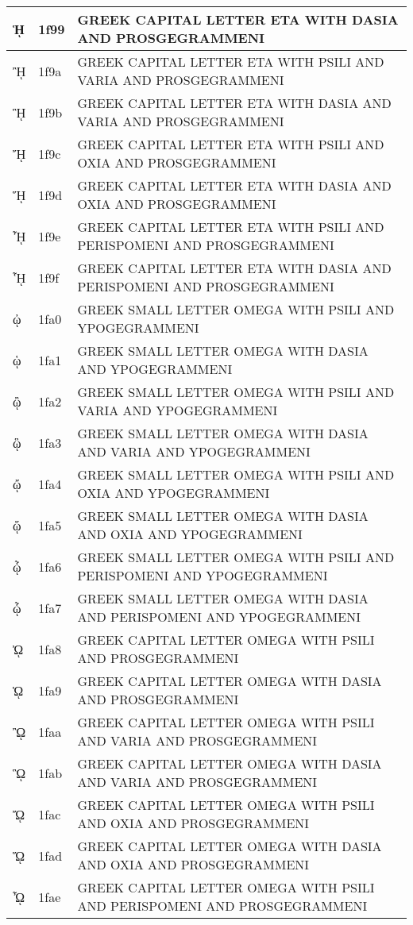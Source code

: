\documentclass[12pt,letterpaper,openany]{book}
\begin{document}
\begin{center}
\begin{supertabular}{|m{0.25in}|m{0.5in}|m{4in}|}
ᾙ & 1f99 & GREEK CAPITAL LETTER ETA WITH DASIA AND PROSGEGRAMMENI\\\hline
ᾚ & 1f9a & GREEK CAPITAL LETTER ETA WITH PSILI AND VARIA AND PROSGEGRAMMENI\\\hline
ᾛ & 1f9b & GREEK CAPITAL LETTER ETA WITH DASIA AND VARIA AND PROSGEGRAMMENI\\\hline
ᾜ & 1f9c & GREEK CAPITAL LETTER ETA WITH PSILI AND OXIA AND PROSGEGRAMMENI\\\hline
ᾝ & 1f9d & GREEK CAPITAL LETTER ETA WITH DASIA AND OXIA AND PROSGEGRAMMENI\\\hline
ᾞ & 1f9e & GREEK CAPITAL LETTER ETA WITH PSILI AND PERISPOMENI AND PROSGEGRAMMENI\\\hline
ᾟ & 1f9f & GREEK CAPITAL LETTER ETA WITH DASIA AND PERISPOMENI AND PROSGEGRAMMENI\\\hline
ᾠ & 1fa0 & GREEK SMALL LETTER OMEGA WITH PSILI AND YPOGEGRAMMENI\\\hline
ᾡ & 1fa1 & GREEK SMALL LETTER OMEGA WITH DASIA AND YPOGEGRAMMENI\\\hline
ᾢ & 1fa2 & GREEK SMALL LETTER OMEGA WITH PSILI AND VARIA AND YPOGEGRAMMENI\\\hline
ᾣ & 1fa3 & GREEK SMALL LETTER OMEGA WITH DASIA AND VARIA AND YPOGEGRAMMENI\\\hline
ᾤ & 1fa4 & GREEK SMALL LETTER OMEGA WITH PSILI AND OXIA AND YPOGEGRAMMENI\\\hline
ᾥ & 1fa5 & GREEK SMALL LETTER OMEGA WITH DASIA AND OXIA AND YPOGEGRAMMENI\\\hline
ᾦ & 1fa6 & GREEK SMALL LETTER OMEGA WITH PSILI AND PERISPOMENI AND YPOGEGRAMMENI\\\hline
ᾧ & 1fa7 & GREEK SMALL LETTER OMEGA WITH DASIA AND PERISPOMENI AND YPOGEGRAMMENI\\\hline
ᾨ & 1fa8 & GREEK CAPITAL LETTER OMEGA WITH PSILI AND PROSGEGRAMMENI\\\hline
ᾩ & 1fa9 & GREEK CAPITAL LETTER OMEGA WITH DASIA AND PROSGEGRAMMENI\\\hline
ᾪ & 1faa & GREEK CAPITAL LETTER OMEGA WITH PSILI AND VARIA AND PROSGEGRAMMENI\\\hline
ᾫ & 1fab & GREEK CAPITAL LETTER OMEGA WITH DASIA AND VARIA AND PROSGEGRAMMENI\\\hline
ᾬ & 1fac & GREEK CAPITAL LETTER OMEGA WITH PSILI AND OXIA AND PROSGEGRAMMENI\\\hline
ᾭ & 1fad & GREEK CAPITAL LETTER OMEGA WITH DASIA AND OXIA AND PROSGEGRAMMENI\\\hline
ᾮ & 1fae & GREEK CAPITAL LETTER OMEGA WITH PSILI AND PERISPOMENI AND PROSGEGRAMMENI\\\hline

\end{supertabular}
\end{center}
\end{document}
